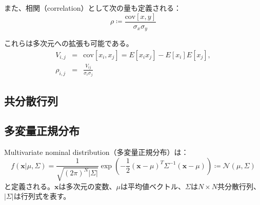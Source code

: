 また、相関（correlation）として次の量も定義される：
\begin{equation}
  \rho \coloneqq \frac{\mathrm{cov}[x,y]}{\sigma_x\sigma_y}
\end{equation}

これらは多次元への拡張も可能である。
\begin{eqnarray}
  V_{i,j}   &=& \mathrm{cov}[x_i, x_j] = E[x_i x_j] - E[x_i]E[x_j], \\
  \rho_{i,j}&=& \frac{V_{ij}}{\sigma_{i}\sigma_{j}}
\end{eqnarray}


\subsection{共分散行列}


\subsection{多変量正規分布}

Multivariate nominal distribution（多変量正規分布）は：
\begin{equation}
  f(\bm{x}|\mu, \Sigma) = \frac{1}{\sqrt{(2\pi)^N |\Sigma|}} \exp \left( -\frac{1}{2}(\bm{x}-\mu)^T \Sigma^{-1} (\bm{x}-\mu) \right) \coloneqq \mathcal{N}(\mu,\Sigma)
\end{equation}
と定義される。$\bm{x}$は多次元の変数、$\mu$は平均値ベクトル、$\Sigma$は$N\times N$共分散行列、$|\Sigma|$は行列式を表す。



